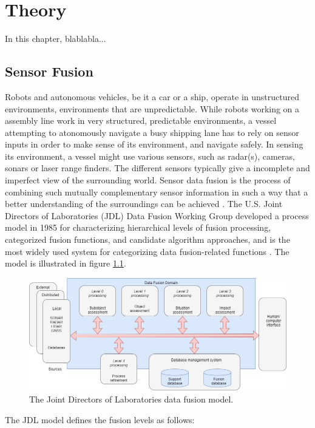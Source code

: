 
\chapter{Theory}
In this chapter, blablabla...
\section{Sensor Fusion}
\label{section:fusion}
Robots and autonomous vehicles, be it a car or a ship, operate in unstructured environments, environments that are unpredictable. While robots working on a assembly line work in very structured, predictable environments, a vessel attempting to atonomously navigate a busy shipping lane has to rely on sensor inputs in order to make sense of its environment, and navigate safely. In sensing its environment, a vessel might use various sensors, such as radar(s), cameras, sonars or laser range finders. The different sensors typically give a incomplete and imperfect view of the surrounding world. Sensor data fusion is the process of combining such mutually complementary sensor information in such a way that a better understanding of the surroundings can be achieved \cite{sensorFusion1}.
The U.S. Joint Directors of Laboratories (JDL) Data Fusion Working Group developed a process model in 1985 for characterizing hierarchical levels of fusion processing, categorized fusion functions, and candidate algorithm approaches, and is the most widely used system for categorizing data fusion-related functions \cite{JDLFusion}. The model is illustrated in figure \ref{fig:jdl_fusion}.
\begin{figure}[H]
    \centering
    \includegraphics[width=.8\linewidth]{fig/JDLfusion.png}
    \caption{The Joint Directors of Laboratories data fusion model.}
    \label{fig:jdl_fusion}
\end{figure}
The JDL model defines the fusion levels as follows:
